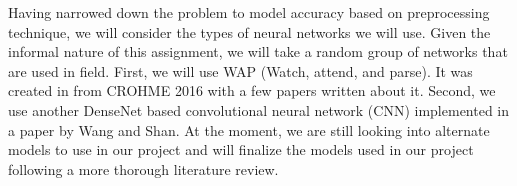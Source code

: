 \documentclass[../proposal.tex]{subfiles}
\begin{document}
\indent Having narrowed down the problem to model accuracy based on preprocessing technique, we will consider the types of neural networks we will use. Given the informal nature of this assignment, we will take a random group of networks that are used in field. First, we will use WAP (Watch, attend, and parse). It was created in from CROHME 2016 with a few papers written about it.\cite{zhang_2017_watch} \cite{zhang_2018_multi} Second, we use another DenseNet based convolutional neural network (CNN) implemented in a paper by Wang and Shan. \cite{Wang_2020_recognizing} At the moment, we are still looking into alternate models to use in our project and will finalize the models used in our project following a more thorough literature review. 
\end{document}
